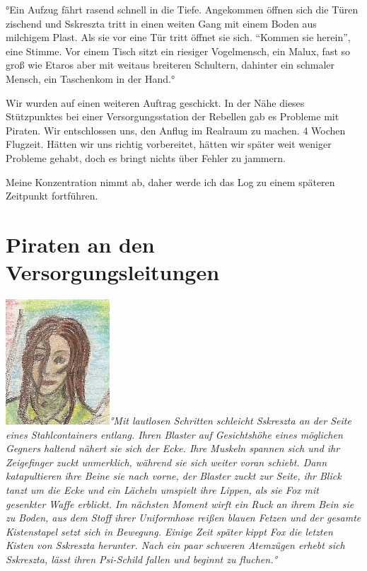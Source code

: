 \documentclass[11pt]{article}
\begin{document}
°Ein Aufzug fährt rasend schnell in die Tiefe. Angekommen öffnen sich
die Türen zischend und Sskreszta tritt in einen weiten Gang mit einem
Boden aus milchigem Plast. Als sie vor eine Tür tritt öffnet sie sich.
``Kommen sie herein'', eine Stimme. Vor einem Tisch sitzt ein riesiger
Vogelmensch, ein Malux, fast so groß wie Etaros aber mit weitaus
breiteren Schultern, dahinter ein schmaler Mensch, ein Taschenkom in der
Hand.°

Wir wurden auf einen weiteren Auftrag geschickt. In der Nähe dieses
Stützpunktes bei einer Versorgungsstation der Rebellen gab es Probleme
mit Piraten. Wir entschlossen uns, den Anflug im Realraum zu machen. 4
Wochen Flugzeit. Hätten wir uns richtig vorbereitet, hätten wir später
weit weniger Probleme gehabt, doch es bringt nichts über Fehler zu
jammern.

Meine Konzentration nimmt ab, daher werde ich das Log zu einem späteren
Zeitpunkt fortführen.

\section{Piraten an den Versorgungsleitungen}

\emph{\includegraphics{sskreszta-portrait-alt-klein.png}°Mit
lautlosen Schritten schleicht Sskreszta an der Seite eines
Stahlcontainers entlang. Ihren Blaster auf Gesichtshöhe eines möglichen
Gegners haltend nähert sie sich der Ecke. Ihre Muskeln spannen sich und
ihr Zeigefinger zuckt unmerklich, während sie sich weiter voran schiebt.
Dann katapultieren ihre Beine sie nach vorne, der Blaster zuckt zur
Seite, ihr Blick tanzt um die Ecke und ein Lächeln umspielt ihre Lippen,
als sie Fox mit gesenkter Waffe erblickt. Im nächsten Moment wirft ein
Ruck an ihrem Bein sie zu Boden, aus dem Stoff ihrer Uniformhose reißen
blauen Fetzen und der gesamte Kistenstapel setzt sich in Bewegung.
Einige Zeit später kippt Fox die letzten Kisten von Sskreszta herunter.
Nach ein paar schweren Atemzügen erhebt sich Sskreszta, lässt ihren
Psi-Schild fallen und beginnt zu fluchen.°}
\end{document}
